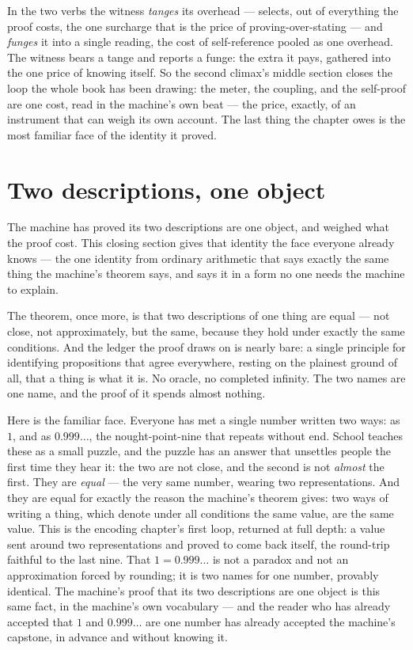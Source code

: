 In the two verbs the witness \emph{tanges} its overhead --- selects, out of everything the proof costs, the one surcharge
that is the price of proving-over-stating --- and \emph{funges} it into a single reading, the cost of self-reference
pooled as one overhead. The witness bears a tange and reports a funge: the extra it pays, gathered into the one price of
knowing itself. So the second climax's middle section closes the loop the whole book has been drawing: the meter, the
coupling, and the self-proof are one cost, read in the machine's own beat --- the price, exactly, of an instrument that
can weigh its own account. The last thing the chapter owes is the most familiar face of the identity it proved.

\section{Two descriptions, one object}

The machine has proved its two descriptions are one object, and weighed what the proof cost. This closing section gives
that identity the face everyone already knows --- the one identity from ordinary arithmetic that says exactly the same
thing the machine's theorem says, and says it in a form no one needs the machine to explain.

The theorem, once more, is that two descriptions of one thing are equal --- not close, not approximately, but the same,
because they hold under exactly the same conditions. And the ledger the proof draws on is nearly bare: a single principle
for identifying propositions that agree everywhere, resting on the plainest ground of all, that a thing is what it is. No
oracle, no completed infinity. The two names are one name, and the proof of it spends almost nothing.

Here is the familiar face. Everyone has met a single number written two ways: as $1$, and as $0.999\ldots$, the
nought-point-nine that repeats without end. School teaches these as a small puzzle, and the puzzle has an answer that
unsettles people the first time they hear it: the two are not close, and the second is not \emph{almost} the first. They
are \emph{equal} --- the very same number, wearing two representations. And they are equal for exactly the reason the
machine's theorem gives: two ways of writing a thing, which denote under all conditions the same value, are the same
value. This is the encoding chapter's first loop, returned at full depth: a value sent around two representations and
proved to come back itself, the round-trip faithful to the last nine. That $1 = 0.999\ldots$ is not a paradox and not an
approximation forced by rounding; it is two names for one number, provably identical. The machine's proof that its two
descriptions are one object is this same fact, in the machine's own vocabulary --- and the reader who has already accepted
that $1$ and $0.999\ldots$ are one number has already accepted the machine's capstone, in advance and without knowing it.

